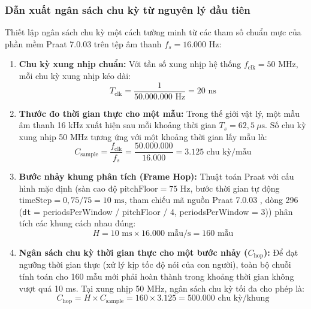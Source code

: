 \subsubsection*{Dẫn xuất ngân sách chu kỳ từ nguyên lý đầu tiên}
Thiết lập ngân sách chu kỳ một cách tường minh từ các tham số chuẩn mực của phần mềm Praat 7.0.03 trên tệp âm thanh $f_s = 16.000\text{ Hz}$:
\begin{enumerate}[leftmargin=1.5em, itemsep=2pt]
    \item \textbf{Chu kỳ xung nhịp chuẩn:} Với tần số xung nhịp hệ thống $f_{\text{clk}} = 50\text{ MHz}$, mỗi chu kỳ xung nhịp kéo dài:
    \begin{equation}
    T_{\text{clk}} = \frac{1}{50.000.000\text{ Hz}} = 20\text{ ns}
    \end{equation}
    \item \textbf{Thước đo thời gian thực cho một mẫu:} Trong thế giới vật lý, một mẫu âm thanh 16 kHz xuất hiện sau mỗi khoảng thời gian $T_s = 62{,}5\ \mu\text{s}$. Số chu kỳ xung nhịp 50 MHz tương ứng với một khoảng thời gian lấy mẫu là:
    \begin{equation}
    C_{\text{sample}} = \frac{f_{\text{clk}}}{f_s} = \frac{50.000.000}{16.000} = 3.125\text{ chu kỳ/mẫu}
    \end{equation}
    \item \textbf{Bước nhảy khung phân tích (Frame Hop):} Thuật toán Praat với cấu hình mặc định (sàn cao độ $\text{pitchFloor} = 75\text{ Hz}$, bước thời gian tự động $\text{timeStep} = 0{,}75 / 75 = 10\text{ ms}$, tham chiếu mã nguồn Praat 7.0.03 , dòng 296 (\texttt{dt} = periodsPerWindow / pitchFloor / 4, periodsPerWindow = 3)) phân tích các khung cách nhau đúng:
    \begin{equation}
    H = 10\text{ ms} \times 16.000\text{ mẫu/s} = 160\text{ mẫu}
    \end{equation}
    \item \textbf{Ngân sách chu kỳ thời gian thực cho một bước nhảy ($C_{\text{hop}}$):} Để đạt ngưỡng thời gian thực (xử lý kịp tốc độ nói của con người), toàn bộ chuỗi tính toán cho 160 mẫu mới phải hoàn thành trong khoảng thời gian không vượt quá 10 ms. Tại xung nhịp 50 MHz, ngân sách chu kỳ tối đa cho phép là:
    \begin{equation}
    C_{\text{hop}} = H \times C_{\text{sample}} = 160 \times 3.125 = 500.000\text{ chu kỳ/khung}
    \end{equation}
\end{enumerate}

